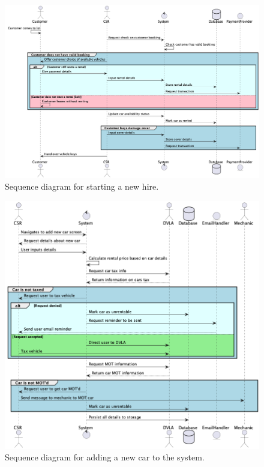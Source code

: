   \begin{figure}[H]
    \centering
    \includegraphics[width=12cm]{assets/Sequence4.png}
    \caption{Sequence diagram for starting a new hire.}
    \label{fig:startHireSequence}
  \end{figure}

  \begin{figure}[H]
    \centering
    \includegraphics[width=12cm]{assets/Sequence5.png}
    \caption{Sequence diagram for adding a new car to the system.}
    \label{fig:newCarSequence}
  \end{figure}
